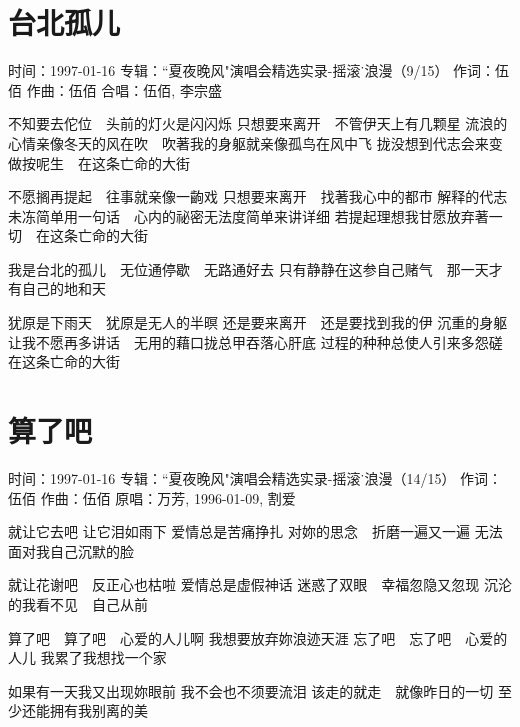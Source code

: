 \documentclass[UTF8,a4paper,oneside,twocolumn,12pt]{ctexbook}
\newcommand{\infopair}[2]{\textbullet #1：#2}
\newcommand{\zc}[1][伍佰]{\infopair{作词}{#1}}
\newcommand{\zq}[1][伍佰]{\infopair{作曲}{#1}}
\newcommand{\zj}[1]{\infopair{专辑}{#1}}
\newcommand{\yc}[1]{\infopair{原唱}{#1}}
\newcommand{\sj}[1]{\infopair{时间}{#1}}
\newenvironment{info}{\begin{flushleft}\kaishu
	}
	{\end{flushleft}\normalsize\yahei\par}
\newenvironment{lyric}{
	}
{}
\begin{document}
\section{台北孤儿}
\begin{info}
	\sj{1997-01-16}
	\zj{``夏夜晚风"演唱会精选实录-摇滚˙浪漫（9/15）}
	\zc
	\zq
	\infopair{合唱}{伍佰, 李宗盛}
\end{info}
\begin{lyric}
	不知要去佗位　头前的灯火是闪闪烁
	只想要来离开　不管伊天上有几颗星
	流浪的心情亲像冬天的风在吹　吹著我的身躯就亲像孤鸟在风中飞
	拢没想到代志会来变做按呢生　在这条亡命的大街

	不愿搁再提起　往事就亲像一齣戏
	只想要来离开　找著我心中的都市
	解释的代志未冻简单用一句话　心内的祕密无法度简单来讲详细
	若提起理想我甘愿放弃著一切　在这条亡命的大街

	我是台北的孤儿　无位通停歇　无路通好去
	只有静静在这参自己赌气　那一天才有自己的地和天

	犹原是下雨天　犹原是无人的半暝
	还是要来离开　还是要找到我的伊
	沉重的身躯让我不愿再多讲话　无用的藉口拢总甲吞落心肝底
	过程的种种总使人引来多怨磋　在这条亡命的大街
\end{lyric}

\section{算了吧}
\begin{info}
	\sj{1997-01-16}
	\zj{``夏夜晚风"演唱会精选实录-摇滚˙浪漫（14/15）}
	\zc
	\zq
	\yc{万芳, 1996-01-09, 割爱}
\end{info}
\begin{lyric}
	就让它去吧 让它泪如雨下
	爱情总是苦痛挣扎
	对妳的思念　折磨一遍又一遍
	无法面对我自己沉默的脸

	就让花谢吧　反正心也枯啦
	爱情总是虚假神话
	迷惑了双眼　幸福忽隐又忽现
	沉沦的我看不见　自己从前

	算了吧　算了吧　心爱的人儿啊
	我想要放弃妳浪迹天涯
	忘了吧　忘了吧　心爱的人儿
	我累了我想找一个家

	如果有一天我又出现妳眼前
	我不会也不须要流泪
	该走的就走　就像昨日的一切
	至少还能拥有我别离的美
\end{lyric}
\end{document}
